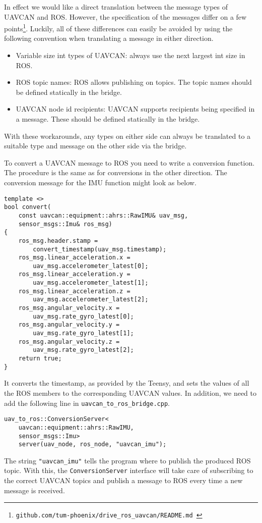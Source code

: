\documentclass[9pt,technote]{IEEEtran} %
\begin{document}
In effect we would like a direct translation between the message types of UAVCAN and ROS.
However, the specification of the messages differ on a few points\footnote{\texttt{github.com/tum-phoenix/drive\_ros\_uavcan/README.md }}.
Luckily, all of these differences can easily be avoided by using the following convention
when translating a message in either direction.
\begin{itemize}
\item Variable size int types of UAVCAN: always use the next largest int size in ROS.
\item ROS topic names: ROS allows publishing on topics. The topic names should be defined statically in the bridge.
\item UAVCAN node id recipients: UAVCAN supports recipients being specified in a message. These should be defined statically in the bridge.
\end{itemize}
With these workarounds, any types on either side can always be translated to a suitable
type and message on the other side via the bridge.

To convert a UAVCAN message to ROS you need to write a conversion
function. The procedure is the same as for conversions in the
other direction. The conversion message for the IMU function
might look as below.
\begin{scriptsize}
\begin{verbatim}
template <>
bool convert(
    const uavcan::equipment::ahrs::RawIMU& uav_msg,
    sensor_msgs::Imu& ros_msg)
{
    ros_msg.header.stamp =
        convert_timestamp(uav_msg.timestamp);
    ros_msg.linear_acceleration.x =
        uav_msg.accelerometer_latest[0];
    ros_msg.linear_acceleration.y =
        uav_msg.accelerometer_latest[1];
    ros_msg.linear_acceleration.z =
        uav_msg.accelerometer_latest[2];
    ros_msg.angular_velocity.x =
        uav_msg.rate_gyro_latest[0];
    ros_msg.angular_velocity.y =
        uav_msg.rate_gyro_latest[1];
    ros_msg.angular_velocity.z =
        uav_msg.rate_gyro_latest[2];
    return true;
}
\end{verbatim}
\end{scriptsize}
It converts the timestamp, as provided by the Teensy,
and sets the values of all the ROS members to the corresponding
UAVCAN values. In addition, we need to add the following
line in \texttt{uavcan\_to\_ros\_bridge.cpp}.
\begin{scriptsize}
\begin{verbatim}
uav_to_ros::ConversionServer<
    uavcan::equipment::ahrs::RawIMU,
    sensor_msgs::Imu>
    server(uav_node, ros_node, "uavcan_imu");
\end{verbatim}
\end{scriptsize}
The string \texttt{"uavcan\_imu"} tells the program where to
publish the produced ROS topic. With this, the \texttt{ConversionServer}
interface will take care of subscribing to the correct UAVCAN topics
and publish a message to ROS every time a new message is received.
\end{document}
